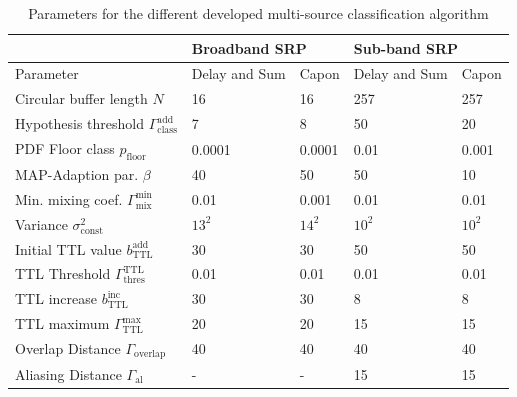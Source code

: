 \begin{appendix}
\begin{table}[!ht]
\centering
\begin{tabular}{l|ll|ll} \toprule
                       & \multicolumn{2}{l}{Broadband SRP} & \multicolumn{2}{l}{Sub-band SRP} \\ \midrule
Parameter              & Delay and Sum       & Capon       & Delay and Sum       & Capon      \\ \midrule
Circular buffer length $N$ & 16                  & 16          & 257                 & 257        \\
Hypothesis threshold $\Gamma_\text{class}^\text{add}$  & 7                   & 8           & 50                  & 20         \\
PDF Floor class $p_\text{floor}$           & 0.0001              & 0.0001      & 0.01                & 0.001      \\
MAP-Adaption par.  $\beta$               & 40                  & 50          & 50                  & 10         \\
Min. mixing coef. $\Gamma^\text{min}_\text{mix}$             & 0.01                & 0.001       & 0.01                & 0.01       \\
Variance $\sigma^2_\text{const}$        & $13^2$                  & $14^2$          & $10^2$                  & $10^2$         \\
Initial TTL value $b_\text{TTL}^\text{add}$      & 30                  & 30          & 50                  & 50         \\
TTL Threshold  $\Gamma^\text{TTL}_\text{thres}$        & 0.01                & 0.01        & 0.01                & 0.01       \\
TTL increase  $b_\text{TTL}^\text{inc}$              & 30                  & 30          & 8                   & 8          \\
TTL maximum  $\Gamma_\text{TTL}^\text{max}$              & 20                  & 20          & 15                  & 15         \\
Overlap Distance $\Gamma_\text{overlap}$      & 40                  & 40          & 40                  & 40         \\
Aliasing Distance  $\Gamma_\text{al}$    & -                   & -           & 15                  & 15        \\
\bottomrule
\end{tabular}
\caption{Parameters for the different developed multi-source classification algorithm}
\label{tab:para_alg}
\end{table}


\end{appendix}
